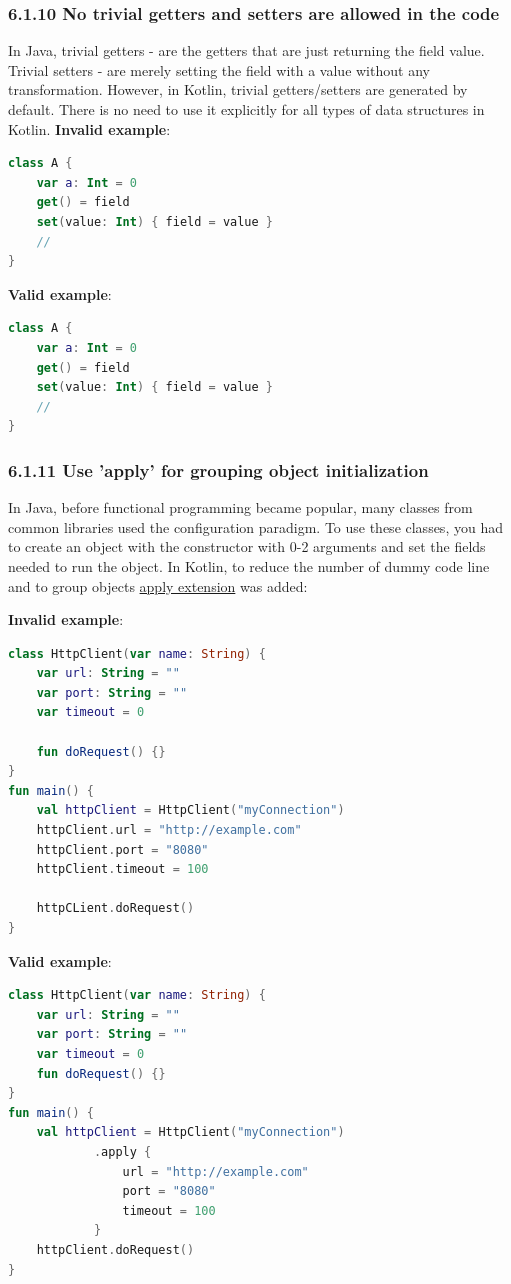 \subsubsection*{\textbf{6.1.10 No trivial getters and setters are allowed in the code}}
\leavevmode\newline
\label{sec:6.1.10}
In Java, trivial getters - are the getters that are just returning the field value.
Trivial setters - are merely setting the field with a value without any transformation.
However, in Kotlin, trivial getters/setters are generated by default. There is no need to use it explicitly for all types of data structures in Kotlin.
\textbf{Invalid example}:
\begin{lstlisting}[language=Kotlin]
class A {
    var a: Int = 0 
    get() = field
    set(value: Int) { field = value }
    //
}
\end{lstlisting}
\textbf{Valid example}:
\begin{lstlisting}[language=Kotlin]
class A {
    var a: Int = 0 
    get() = field
    set(value: Int) { field = value }
    //
}
\end{lstlisting}
\subsubsection*{\textbf{6.1.11 Use 'apply' for grouping object initialization}}
\leavevmode\newline
\label{sec:6.1.11}
In Java, before functional programming became popular, many classes from common libraries used the configuration paradigm.
To use these classes, you had to create an object with the constructor with 0-2 arguments and set the fields needed to run the object.
In Kotlin, to reduce the number of dummy code line and to group objects \href{https://kotlinlang.org/api/latest/jvm/stdlib/kotlin/apply.html}{apply extension} was added:  
 
\textbf{Invalid example}:
\begin{lstlisting}[language=Kotlin]
class HttpClient(var name: String) {
    var url: String = ""
    var port: String = ""
    var timeout = 0
    
    fun doRequest() {}
}
fun main() {
    val httpClient = HttpClient("myConnection")
    httpClient.url = "http://example.com"
    httpClient.port = "8080"
    httpClient.timeout = 100
    
    httpCLient.doRequest()
}   
\end{lstlisting}
\textbf{Valid example}:
\begin{lstlisting}[language=Kotlin]
class HttpClient(var name: String) {
    var url: String = ""
    var port: String = ""
    var timeout = 0
    fun doRequest() {}
}
fun main() {
    val httpClient = HttpClient("myConnection")
            .apply {
                url = "http://example.com"
                port = "8080"
                timeout = 100
            }
    httpClient.doRequest()
}
\end{lstlisting}
